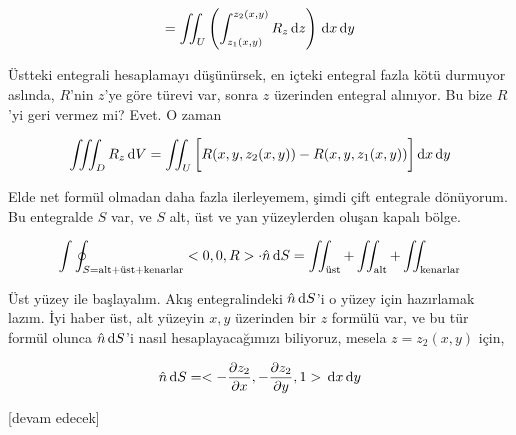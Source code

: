 \documentclass[12pt,fleqn]{article}\usepackage{../../common}
\begin{document}
$$
= \iint_U \left( \int_{z_1(x,y)}^{z_2(x,y)} R_z \,\mathrm{d} z  \right) \,\mathrm{d} x \,\mathrm{d} y  
$$

Üstteki entegrali hesaplamayı düşünürsek, en içteki entegral fazla kötü durmuyor
aslında, $R$'nin $z$'ye göre türevi var, sonra $z$ üzerinden entegral alınıyor.
Bu bize $R$'yi geri vermez mi? Evet. O zaman

$$
\iiint_D R_z \,\mathrm{d} V = \iint_U \bigg[ R(x,y,z_2(x,y)) - R(x,y,z_1(x,y))  \bigg]
\,\mathrm{d} x \,\mathrm{d} y
$$

Elde net formül olmadan daha fazla ilerleyemem, şimdi çift entegrale dönüyorum.
Bu entegralde $S$ var, ve $S$ alt, üst ve yan yüzeylerden oluşan kapalı bölge.

$$
\int \oint_{S = \textrm{alt+üst+kenarlar}} < 0,0,R > \cdot \hat{n} \,\mathrm{d} S =
\iint_{\textrm{üst}} + \iint_{\textrm{alt}} + \iint_{\textrm{kenarlar}} 
$$

Üst yüzey ile başlayalım. Akış entegralindeki $\hat{n} \,\mathrm{d} S$'i o yüzey
için hazırlamak lazım. İyi haber üst, alt yüzeyin $x,y$ üzerinden bir $z$
formülü var, ve bu tür formül olunca $\hat{n} \,\mathrm{d} S$'i nasıl hesaplayacağımızı
biliyoruz, mesela $z=z_2(x,y)$ için,

$$
\hat{n} \,\mathrm{d} S = <
-\frac{\partial z_2}{\partial x}, 
-\frac{\partial z_2}{\partial y},
1
> \,\mathrm{d} x \,\mathrm{d} y
$$












[devam edecek]
\end{document}
